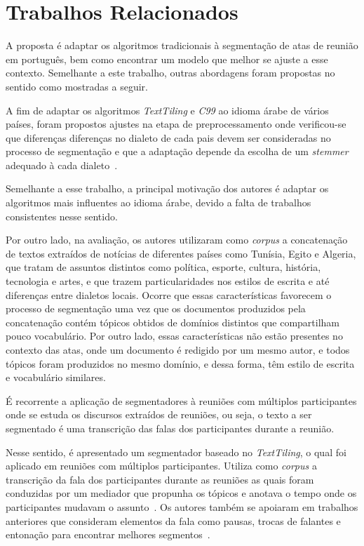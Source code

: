 \section{Trabalhos Relacionados}
	\label{sec:trabalhos}

A proposta é adaptar os algoritmos tradicionais à segmentação de atas de reunião em português, bem como encontrar um modelo que melhor se ajuste a esse contexto. Semelhante a este trabalho, outras abordagens foram propostas no sentido como mostradas a seguir.



A fim de adaptar os algoritmos \textit{TextTiling} e \textit{C99} ao idioma árabe de vários países, foram propostos ajustes na etapa de preprocessamento onde verificou-se que diferenças diferenças no dialeto de cada
pais devem ser consideradas no processo de segmentação e que a adaptação depende da escolha de um \textit{stemmer} adequado à cada dialeto~\cite{CHAIBI2014}.


Semelhante a esse trabalho, a principal motivação dos autores é adaptar os algoritmos mais influentes ao idioma árabe, devido a falta de trabalhos consistentes nesse sentido. 

Por outro lado, na avaliação, os autores utilizaram como \textit{corpus} a concatenação de textos extraídos de notícias de diferentes países como Tunísia, Egito e Algeria, que tratam de assuntos distintos como política, esporte, cultura, história, tecnologia e artes, e que trazem particularidades nos estilos de escrita e até diferenças entre dialetos locais. Ocorre que essas características favorecem o processo de segmentação uma vez que os documentos produzidos pela concatenação contém tópicos obtidos de domínios distintos que compartilham pouco vocabulário. Por outro lado, essas características não estão presentes no contexto das atas, onde um documento é redigido por um mesmo autor, e todos tópicos foram produzidos no mesmo domínio, e dessa forma, têm estilo de escrita e vocabulário similares.




É recorrente a aplicação de segmentadores à reuniões com múltiplos participantes onde se estuda os discursos extraídos de reuniões, ou seja, o texto a ser segmentado é uma transcrição das falas dos participantes durante a reunião.
%

Nesse sentido, é apresentado um segmentador baseado no  \textit{TextTiling}, o qual foi aplicado em reuniões com múltiplos participantes. Utiliza como \textit{corpus} a transcrição da fala dos participantes durante as reuniões as quais foram conduzidas por um mediador que propunha os tópicos e anotava o tempo onde os participantes mudavam o assunto~\cite{Banerjee2006}. 
Os autores também se apoiaram em trabalhos anteriores que consideram elementos da fala como pausas, trocas de falantes e entonação para encontrar melhores segmentos~\cite{Galley2003}.


